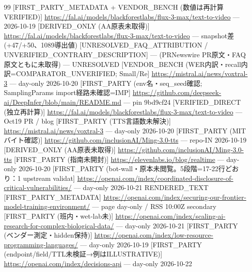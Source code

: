 \documentclass[lualatex,a4paper,10pt]{jlreq}
\begin{document}
{\begin{thebibliography}{99}
 [FIRST\_PARTY\_METADATA + VENDOR\_BENCH (数値は再計算VERIFIED)] \url{https://fal.ai/models/blackforestlabs/flux-3-max/text-to-video} --- 2026-10-19
 [DERIVED\_ONLY (AA原表未取得)] \url{https://fal.ai/models/blackforestlabs/flux-3-max/text-to-video} --- snapshot差 (+47/+50、1089導出値)
 [UNRESOLVED\_FAQ\_ATTRIBUTION / UNVERIFIED\_CONTRARY\_DESCRIPTION] — (PRNewswire PR原文・FAQ原文ともに未取得) --- UNRESOLVED
 [VENDOR\_BENCH (WER内訳・recall内訳=COMPARATOR\_UNVERIFIED; Small/Re] \url{https://mistral.ai/news/voxtral-3} --- day-only 2026-10-20
 [FIRST\_PARTY (env名・seq\_seed確認; SamplingParams import経路未確認=IMP] \url{https://github.com/deepseek-ai/DeepInfer/blob/main/README.md} --- pin 9bd9cf24
 [VERIFIED\_DIRECT (独立再計算)] \url{https://fal.ai/models/blackforestlabs/flux-3-max/text-to-video} --- Oct19 PR / blog
 [FIRST\_PARTY (TTS言語数未解決)] \url{https://mistral.ai/news/voxtral-3} --- day-only 2026-10-20
 [FIRST\_PARTY (MITバイト確認)] \url{https://github.com/inclusionAI/Ming-3.0-tts} --- repo-IN 2026-10-19
 [DERIVED\_ONLY (AA原表未取得)] \url{https://github.com/inclusionAI/Ming-3.0-tts} 
 [FIRST\_PARTY (指南未開封)] \url{https://elevenlabs.io/blog/realtime} --- day-only 2026-10-20
 [FIRST\_PARTY (bot-wall・原本未閲覧。5段階=17-22行どおり：1 upstream validat] \url{https://openai.com/index/coordinated-disclosure-of-critical-vulnerabilities/} --- day-only 2026-10-21 RENDERED\_TEXT
 [FIRST\_PARTY\_METADATA] \url{https://openai.com/index/securing-our-frontier-model-training-environment/} --- page day-only / RSS 10:00Z secondary
 [FIRST\_PARTY (班内・wet-lab未)] \url{https://openai.com/index/scaling-ai-research-for-complex-biological-data/} --- day-only 2026-10-21
 [FIRST\_PARTY (ベンダー測定・hidden保持)] \url{https://openai.com/index/low-resource-programming-languages/} --- day-only 2026-10-19
 [FIRST\_PARTY (endpoint/field/TTL未検証→例はILLUSTRATIVE)] \url{https://openai.com/index/decisions-api} --- day-only 2026-10-22

\end{thebibliography}}
\end{document}
